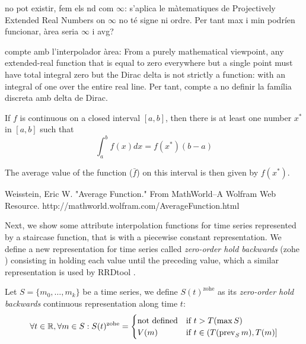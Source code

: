 {no pot existir, fem els nd com $\infty$: s'aplica le màtematiques de Projectively Extended Real Numbers on $\infty$ no té signe ni ordre. Per tant max i min podríen funcionar, àrea seria $\infty$ i avg?


compte amb l'interpolador àrea: From a purely mathematical viewpoint, any extended-real function that is equal to zero everywhere but a single point must have total integral zero but the Dirac delta is not strictly a function: with an integral of one over the entire real line. Per tant, compte a no definir la família discreta amb delta de Dirac.



If $f$ is continuous on a closed interval $[a,b]$, then there is at least one number $x^*$ in $[a,b]$ such that
$$
\int_a^b f(x)dx = f(x^*)(b-a)
$$

The average value of the function ($\bar f$)  on this interval is then given by  $f(x^*)$.

Weisstein, Eric W. "Average Function." From MathWorld--A Wolfram Web Resource. http://mathworld.wolfram.com/AverageFunction.html



}


Next, we show some attribute interpolation functions for time series
represented by a staircase function, that is with a piecewise constant
representation.  We define a new representation for time series called
\emph{zero-order hold backwards} (zohe%
) consisting in holding each value until the preceding
value, which a similar representation is used by RRDtool
\cite{lisa98:oetiker}.

Let $S=\{m_0,\ldots,m_k\}$ be a time series,
we define $S(t)^{\text{zohe}}$ as its \emph{zero-order hold backwards} continuous representation along time $t$:
$$
\forall t \in \mathbb{R}  ,\forall m \in S:
S(t)^{\text{zohe}} =  
\begin{cases}
  \text{not defined} & \text{if } t > T(\max S) \\
  V(m) & \text{if }  t\in (T(\operatorname*{prev}_S m),T(m)]
\end{cases}
$$



